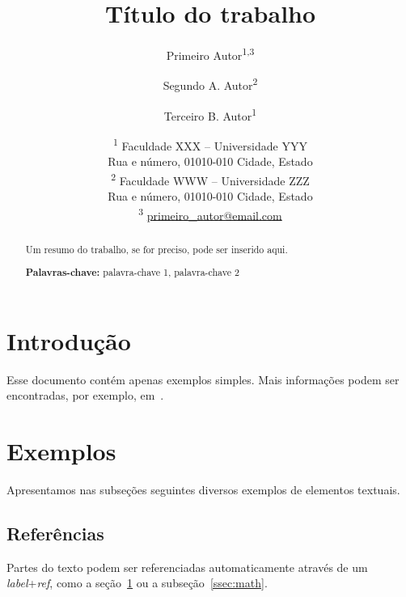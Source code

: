 \documentclass[a4paper,11pt]{article}
\begin{document}
\title{Título do trabalho}

\author{Primeiro Autor\textsuperscript{1,3}
\and Segundo A. Autor\textsuperscript{2}
\and Terceiro B. Autor\textsuperscript{1}}

\date{%
\textsuperscript{1} Faculdade XXX -- Universidade YYY\\
Rua e número, 01010-010 Cidade, Estado\\[1.6ex]
\textsuperscript{2} Faculdade WWW -- Universidade ZZZ\\
Rua e número, 01010-010 Cidade, Estado\\[1.6ex]
\textsuperscript{3} \href{mailto:primeiro_autor@email.com}{primeiro\_autor@email.com}}

\maketitle


\begin{abstract}

Um resumo do trabalho, se for preciso, pode ser inserido aqui.

{\bf\footnotesize Palavras-chave:} palavra-chave 1, palavra-chave 2

\end{abstract}


\tableofcontents


\section{Introdução}
\label{sec:intro}

Esse documento contém apenas exemplos simples.
Mais informações podem ser encontradas, por exemplo, em~\cite{oetiker_not_2015,latex_wikibook}.


\section{Exemplos}

Apresentamos nas subseções seguintes diversos exemplos de elementos textuais.


\subsection{Referências}

Partes do texto podem ser referenciadas automaticamente através de um \emph{label}+\emph{ref}, como a seção~\ref{sec:intro} ou a subseção~\ref{ssec:math}.
\end{document}

